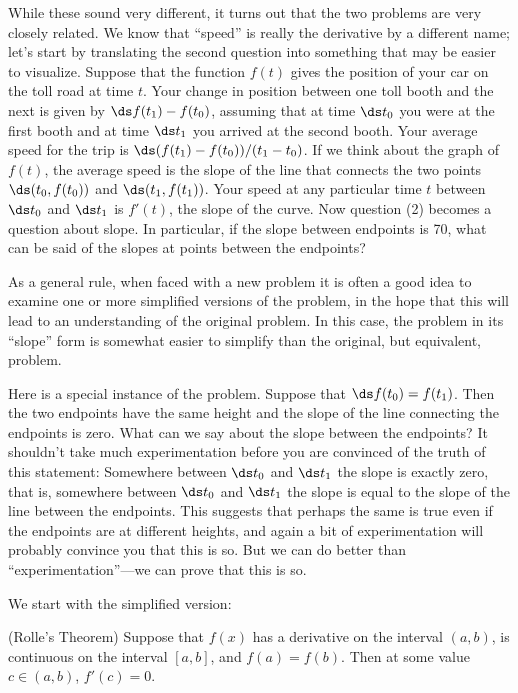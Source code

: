 While these sound very different, it turns out that the two problems
are very closely related. We know that ``speed'' is really the
derivative by a different name; let's start by translating the second
question into something that may be easier to visualize. Suppose that
the function $f(t)$ gives the position of your car on the toll road at
time $t$. Your change in position between one toll booth and the next
is given by $\ds f(t_1)-f(t_0)$, assuming that at time $\ds t_0$ you were at
the first booth and at time $\ds t_1$ you arrived at the second
booth. Your average speed for the trip is
$\ds (f(t_1)-f(t_0))/(t_1-t_0)$. If we think about the graph of $f(t)$,
the average speed is the slope of the line that connects the two
points $\ds (t_0,f(t_0))$ and $\ds (t_1,f(t_1))$. Your speed at any particular time
$t$ between $\ds t_0$ and $\ds t_1$ is $f'(t)$, the slope of the curve. Now
question (2) becomes a question about slope. In particular, if the
slope between endpoints is 70, what can be said of the slopes at
points between the endpoints?

As a general rule, when faced with a new problem it is often a good idea to
examine one or more simplified versions of the problem, in the hope
that this will lead to an understanding of the original problem.
In this case, the problem in its ``slope'' form is somewhat easier to
simplify than the original, but equivalent, problem.

Here is a special instance of the problem. Suppose that
$\ds f(t_0)=f(t_1)$. Then the two endpoints have the same height and the
slope of the line connecting the endpoints is zero. What can we say
about the slope between the endpoints? It shouldn't take much
experimentation before you are convinced of the truth of this
statement: Somewhere between $\ds t_0$ and $\ds t_1$ the slope is exactly
zero, that is, somewhere between $\ds t_0$ and $\ds t_1$ the slope is equal to
the slope of the line between the endpoints. This suggests that
perhaps the same is true even if the endpoints are at different
heights, and again a bit of experimentation will probably convince you
that this is so. But we can do better than ``experimentation''---we
can prove that this is so.

We start with the simplified version:

\begin{theorem} (Rolle's Theorem) Suppose that $f(x)$ has a derivative on the
interval $(a,b)$, is continuous on the interval $[a,b]$, and
$f(a)=f(b)$. Then at some value $c\in (a,b)$, $f'(c)=0$.
\label{thm:rolle}
\end{theorem}


